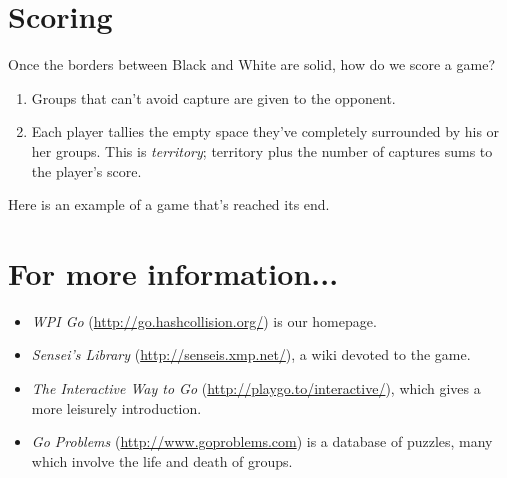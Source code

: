 \documentclass{article}
\begin{document}
\section*{Scoring}

Once the borders between Black and White are solid, how do we score a game?
\begin{enumerate}
\item Groups that can't avoid capture are given to the opponent.

\item Each player tallies the empty space they've completely surrounded
  by his or her groups.  This is \emph{territory}; territory plus the
  number of captures sums to the player's score.
\end{enumerate}
%
Here is an example of a game that's reached its end.
\begin{center}
\hspace{.3in}
\hspace{.3in}
\end{center}




\section*{For more information...}
\begin{itemize}
\item \emph{WPI Go} (\url{http://go.hashcollision.org/}) is our homepage.

\item \emph{Sensei's Library} (\url{http://senseis.xmp.net/}), a wiki
  devoted to the game.

\item \emph{The Interactive Way to Go}
  (\url{http://playgo.to/interactive/}), which gives a more leisurely
  introduction.

\item \emph{Go Problems}
 (\url{http://www.goproblems.com}) is a database of puzzles, many
  which involve the life and death of groups.

\end{itemize}
\end{document}

